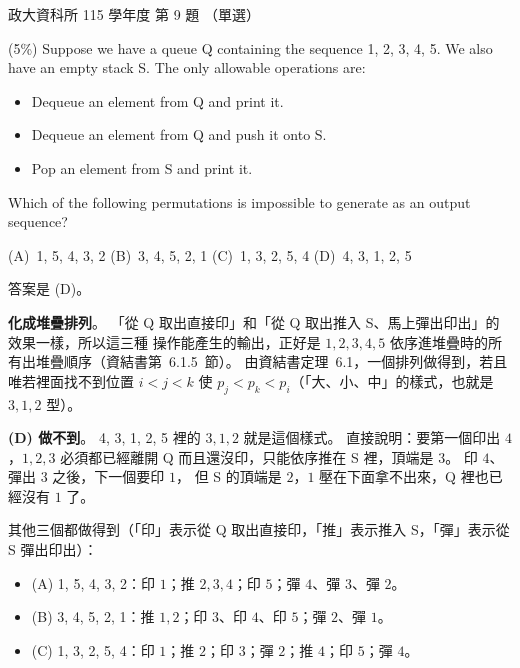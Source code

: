 \begin{pastexam}[label={px:nccu-115-dsa-09}]{政大資科所 115 學年度 第 9 題}
（單選）

(5\%) Suppose we have a queue Q containing the sequence 1, 2, 3, 4, 5. We also have an empty stack S.
The only allowable operations are:
\begin{itemize}
\item Dequeue an element from Q and print it.
\item Dequeue an element from Q and push it onto S.
\item Pop an element from S and print it.
\end{itemize}
Which of the following permutations is impossible to generate as an output sequence?

(A)~1, 5, 4, 3, 2 \qquad (B)~3, 4, 5, 2, 1 \qquad (C)~1, 3, 2, 5, 4 \qquad (D)~4, 3, 1, 2, 5
\end{pastexam}

\begin{pastsoln}
答案是 (D)。

\textbf{化成堆疊排列}。 「從 Q 取出直接印」和「從 Q 取出推入 S、馬上彈出印出」的效果一樣，所以這三種
操作能產生的輸出，正好是 $1, 2, 3, 4, 5$ 依序進堆疊時的所有出堆疊順序（資結書第~6.1.5~節）。
由資結書定理~6.1，一個排列做得到，若且唯若裡面找不到位置 $i < j < k$ 使
$p_j < p_k < p_i$（「大、小、中」的樣式，也就是 $3, 1, 2$ 型）。

\textbf{(D) 做不到}。 4, 3, 1, 2, 5 裡的 $3, 1, 2$ 就是這個樣式。 直接說明：要第一個印出 $4$，$1, 2, 3$
必須都已經離開 Q 而且還沒印，只能依序推在 S 裡，頂端是 $3$。 印 $4$、彈出 $3$ 之後，下一個要印 $1$，
但 S 的頂端是 $2$，$1$ 壓在下面拿不出來，Q 裡也已經沒有 $1$ 了。

其他三個都做得到（「印」表示從 Q 取出直接印，「推」表示推入 S，「彈」表示從 S 彈出印出）：
\begin{itemize}
\item (A) 1, 5, 4, 3, 2：印 $1$；推 $2, 3, 4$；印 $5$；彈 $4$、彈 $3$、彈 $2$。
\item (B) 3, 4, 5, 2, 1：推 $1, 2$；印 $3$、印 $4$、印 $5$；彈 $2$、彈 $1$。
\item (C) 1, 3, 2, 5, 4：印 $1$；推 $2$；印 $3$；彈 $2$；推 $4$；印 $5$；彈 $4$。
\end{itemize}
\end{pastsoln}
